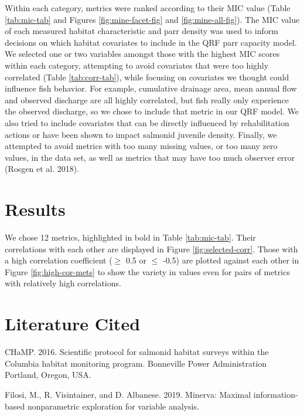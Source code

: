 \documentclass[
  12pt,
]{article}
\begin{document}
Within each category, metrics were ranked according to their MIC value (Table \ref{tab:mic-tab} and Figures \ref{fig:mine-facet-fig} and \ref{fig:mine-all-fig}). The MIC value of each measured habitat characteristic and parr density was used to inform decisions on which habitat covariates to include in the QRF parr capacity model. We selected one or two variables amongst those with the highest MIC scores within each category, attempting to avoid covariates that were too highly correlated (Table \ref{tab:corr-tab}), while focusing on covariates we thought could influence fish behavior. For example, cumulative drainage area, mean annual flow and observed discharge are all highly correlated, but fish really only experience the observed discharge, so we chose to include that metric in our QRF model. We also tried to include covariates that can be directly influenced by rehabilitation actions or have been shown to impact salmonid juvenile density. Finally, we attempted to avoid metrics with too many missing values, or too many zero values, in the data set, as well as metrics that may have too much observer error (Rosgen et al. 2018).

\hypertarget{results}{%
\section{Results}\label{results}}

We chose 12 metrics, highlighted in bold in Table \ref{tab:mic-tab}. Their correlations with each other are displayed in Figure \ref{fig:selected-corr}. Those with a high correlation coefficient (\(\geq\) 0.5 or \(\leq\) -0.5) are plotted against each other in Figure \ref{fig:high-cor-mets} to show the variety in values even for pairs of metrics with relatively high correlations.

\newpage

\hypertarget{literature-cited}{%
\section{Literature Cited}\label{literature-cited}}

\hypertarget{refs}{}
\leavevmode\hypertarget{ref-CHaMP2016}{}%
CHaMP. 2016. Scientific protocol for salmonid habitat surveys within the Columbia habitat monitoring program. Bonneville Power Administration Portland, Oregon, USA.

\leavevmode\hypertarget{ref-R-minerva}{}%
Filosi, M., R. Visintainer, and D. Albanese. 2019. Minerva: Maximal information-based nonparametric exploration for variable analysis.
\end{document}
